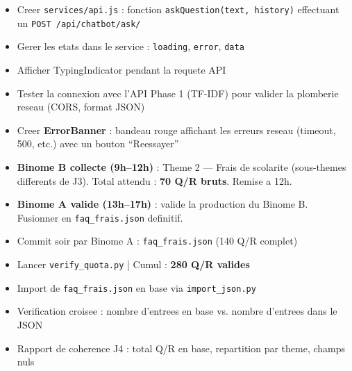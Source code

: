 \documentclass[11pt,a4paper]{article}
\begin{document}
\begin{reactbox}[Frontend --- J4]
\begin{itemize}
    \item[$\square$] Creer \texttt{services/api.js} : fonction \texttt{askQuestion(text, history)} effectuant un \texttt{POST /api/chatbot/ask/}
    \item[$\square$] Gerer les etats dans le service : \texttt{loading}, \texttt{error}, \texttt{data}
    \item[$\square$] Afficher TypingIndicator pendant la requete API
    \item[$\square$] Tester la connexion avec l'API Phase 1 (TF-IDF) pour valider la plomberie reseau (CORS, format JSON)
    \item[$\square$] Creer \textbf{ErrorBanner} : bandeau rouge affichant les erreurs reseau (timeout, 500, etc.) avec un bouton ``Reessayer''
\end{itemize}
\end{reactbox}

\begin{databox}[Data --- J4]
\begin{itemize}
    \item[$\square$] \textbf{Binome B collecte (9h--12h)} : Theme 2 --- Frais de scolarite (sous-themes differents de J3). Total attendu : \textbf{70 Q/R bruts}. Remise a 12h.
    \item[$\square$] \textbf{Binome A valide (13h--17h)} : valide la production du Binome B. Fusionner en \texttt{faq\_frais.json} definitif.
    \item[$\square$] Commit soir par Binome A : \texttt{faq\_frais.json} (140 Q/R complet)
    \item[$\square$] Lancer \texttt{verify\_quota.py} | Cumul : \textbf{280 Q/R valides}
\end{itemize}
\end{databox}

\begin{dbbox}
\begin{itemize}
    \item[$\square$] Import de \texttt{faq\_frais.json} en base via \texttt{import\_json.py}
    \item[$\square$] Verification croisee : nombre d'entrees en base vs. nombre d'entrees dans le JSON
    \item[$\square$] Rapport de coherence J4 : total Q/R en base, repartition par theme, champs nuls
\end{itemize}
\end{dbbox}
\end{document}
